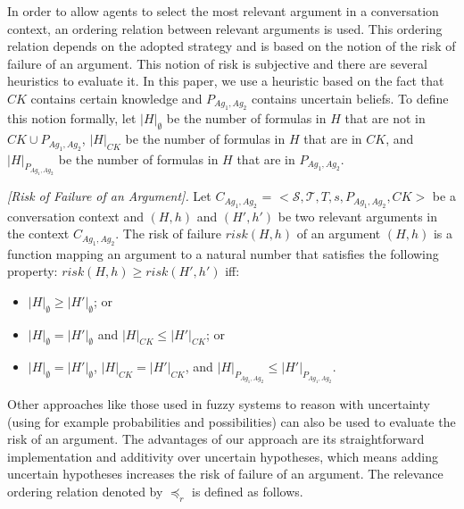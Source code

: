 In order to allow agents to select the most relevant argument in a conversation context, an ordering relation between relevant
arguments is used. This ordering relation depends on the adopted strategy and is based on the notion of the risk of failure of an
argument. This notion of risk is subjective and there are several heuristics to evaluate it. In this paper, we use a heuristic based
on the fact that $CK$ contains certain knowledge and $P_{Ag_1,Ag_2}$ contains uncertain beliefs. To define this notion
formally, let $|H|_{\emptyset}$ be the number of formulas in $H$ that are not in $CK \cup P_{Ag_1,Ag_2}$, $|H|_{CK}$ be the number
of formulas in $H$ that are in $CK$, and $|H|_{P_{Ag_1,Ag_2}}$ be the number of formulas in $H$ that are in $P_{Ag_1,Ag_2}$.

\begin{definition}{\emph{[Risk of Failure of an Argument]. }} \label{risk}
Let $C_{Ag_1,Ag_2}$ = $\big<\mathcal{S},\mathcal{T},T, s,P_{Ag_1,Ag_2},CK\big>$ be a conversation context and $(H, h)$
and $(H', h')$ be two relevant arguments in the context $C_{Ag_1,Ag_2}$. The risk of failure $risk(H, h)$ of an argument
$(H, h)$ is a function mapping an argument to a natural number that satisfies the following property: $risk(H, h)\geq risk(H',
h')$ iff:
\begin{itemize}
\item   $|H|_{\emptyset} \geq |H'|_{\emptyset}$; or

\item   $|H|_{\emptyset} = |H'|_{\emptyset}$ and $|H|_{CK} \leq
|H'|_{CK}$; or

\item $|H|_{\emptyset} = |H'|_{\emptyset}$, $|H|_{CK} =
|H'|_{CK}$, and $|H|_{P_{Ag_1,Ag_2}} \leq |H'|_{P_{Ag_1,Ag_2}}$.
\end{itemize}
\end{definition}

Other approaches like those used in fuzzy systems to reason with uncertainty (using for example probabilities and possibilities)
can also be used to evaluate the risk of an argument. The advantages of our approach are its straightforward implementation
and additivity over uncertain hypotheses, which means adding uncertain hypotheses increases the risk of failure of an argument.
The relevance ordering relation denoted by $\preceq_r$ is defined as follows.

